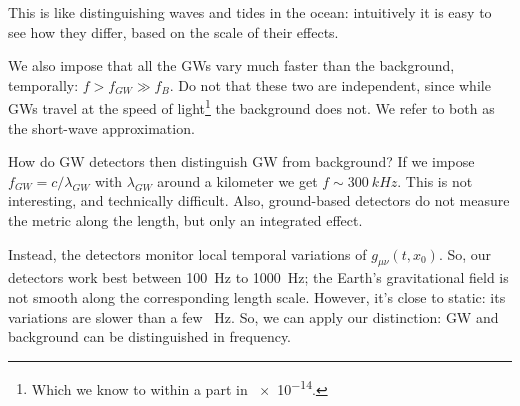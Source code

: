 \documentclass[main.tex]{subfiles}
\begin{document}
This is like distinguishing waves and tides in the ocean: intuitively it is easy to see how they differ, based on the scale of their effects.

We also impose that all the GWs vary much faster than the background, temporally: \(f > f_{GW} \gg f_B\). 
Do not that these two are independent, since while GWs travel at the speed of light\footnote{Which we know to within a part in \num{e-14}.} the background does not. 
We refer to both as the short-wave approximation. 

How do GW detectors then distinguish GW from background? 
If we impose \(f_{GW} = c / \lambda_{GW}\) with \(\lambda_{GW}\) around a kilometer we get \(f \sim \SI{300}{kHz}\). This is not interesting, and technically difficult. 
Also, ground-based detectors do not measure the metric along the length, but only an integrated effect. 

Instead, the detectors monitor local temporal variations of \(g_{\mu \nu } (t, x_0 )\). 
So, our detectors work best between \SI{100}{Hz} to \SI{1000}{Hz}; the Earth's gravitational field is not smooth along the corresponding length scale. However, it's close to static: its variations are slower than a few \SI{}{Hz}.
So, we can apply our distinction: GW and background can be distinguished in frequency. 
\end{document}
